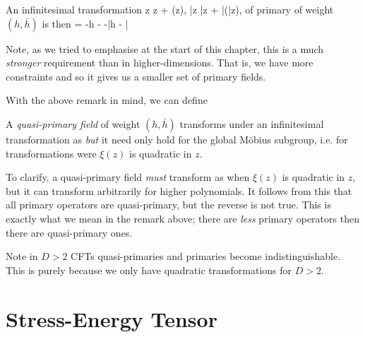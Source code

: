 An infinitesimal transformation
\bse 
    z \mapsto z + \xi(z), \qand \bar{z} \mapsto \bar{z} + \bar{\xi}(\bar{z}),
\ese 
of primary of weight $(h,\bar{h})$ is then 
\be 
\label{eqn:InfintesimalPrimaryTransformation2D}
    \del \varphi = -h  \varphi - \xi {} -\bar{h}  \varphi - \bar{\xi} 
\ee 

\br 
    Note, as we tried to emphasise at the start of this chapter, this is a much \textit{stronger} requirement than in higher-dimensions. That is, we have more constraints and so it gives us a smaller set of primary fields. 
\er 

With the above remark in mind, we can define

    A \textit{quasi-primary field} of weight $(h,\bar{h})$ transforms under an infinitesimal transformation as  \textit{but} it need only hold for the global M\"{o}bius subgroup, i.e. for transformations were $\xi(z)$ is quadratic in $z$.
\ed 

To clarify, a quasi-primary field \textit{must} transform as  when $\xi(z)$ is quadratic in $z$, but it can transform arbitrarily for higher polynomials. It follows from this that all primary operators are quasi-primary, but the reverse is not true. This is exactly what we mean in the remark above; there are \textit{less} primary operators then there are quasi-primary ones.

\br 
    Note in $D>2$ CFTs quasi-primaries and primaries become indistinguishable. This is purely because we only have quadratic transformations for $D>2$. 
\er 

\section{Stress-Energy Tensor}

